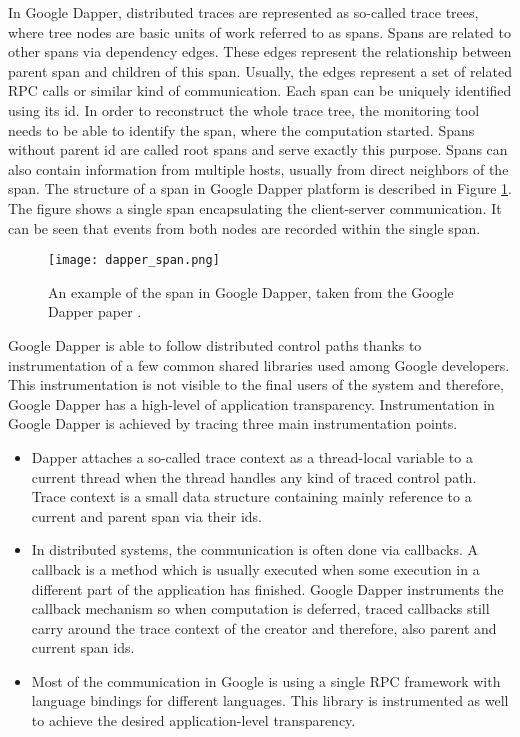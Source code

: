 In Google Dapper, distributed traces are represented as so-called trace trees, where tree nodes are basic units of work referred to as spans. Spans are related to other spans via dependency edges. These edges represent the relationship between parent span and children of this span. Usually, the edges represent a set of related RPC calls or similar kind of communication. Each span can be uniquely identified using its id. In order to reconstruct the whole trace tree, the monitoring tool needs to be able to identify the span, where the computation started. Spans without parent id are called root spans and serve exactly this purpose. Spans can also contain information from multiple hosts, usually from direct neighbors of the span. The structure of a span in Google Dapper platform is described in Figure \ref{fig:dapper_span}. The figure shows a single span encapsulating the client-server communication. It can be seen that events from both nodes are recorded within the single span.
\begin{figure}
	\centering
		\texttt{[image: dapper\_span.png]}
	\caption{An example of the span in Google Dapper, taken from the Google Dapper paper \cite{DapperPaper}.}
	\label{fig:dapper_span}
\end{figure}

Google Dapper is able to follow distributed control paths thanks to instrumentation of a few common shared libraries used among Google developers. This instrumentation is not visible to the final users of the system and therefore, Google Dapper has a high-level of application transparency. Instrumentation in Google Dapper is achieved by tracing three main instrumentation points. 
\begin{itemize}
	\item Dapper attaches a so-called trace context as a thread-local variable to a current thread when the thread handles any kind of traced control path. Trace context is a small data structure containing mainly reference to a current and parent span via their ids.
	
	\item In distributed systems, the communication is often done via callbacks. A callback is a method which is usually executed when some execution in a different part of the application has finished. Google Dapper instruments the callback mechanism so when computation is deferred, traced callbacks still carry around the trace context of the creator and therefore, also parent and current span ids.
	
	\item Most of the communication in Google is using a single RPC framework with language bindings for different languages. This library is instrumented as well to achieve the desired application-level transparency.
\end{itemize}

